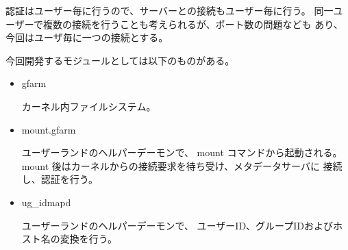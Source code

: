 認証はユーザー毎に行うので、サーバーとの接続もユーザー毎に行う。
同一ユーザーで複数の接続を行うことも考えられるが、ポート数の問題なども
あり、今回はユーザ毎に一つの接続とする。

今回開発するモジュールとしては以下のものがある。
\begin{itemize}
\item	gfarm \par
	カーネル内ファイルシステム。

\item	mount.gfarm \par
	ユーザーランドのヘルパーデーモンで、
	mount コマンドから起動される。
	mount 後はカーネルからの接続要求を待ち受け、メタデータサーバに
	接続し、認証を行う。
\item	ug_idmapd \par
	ユーザーランドのヘルパーデーモンで、
	ユーザーID、グループIDおよびホスト名の変換を行う。
\end{itemize}

